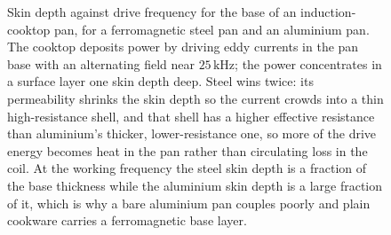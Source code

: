 \begin{figure}[htbp]
\centering
{}
\caption[Skin depth against frequency for an induction-cooktop pan]{Skin
depth against drive frequency for the base of an induction-cooktop pan, for
a ferromagnetic steel pan and an aluminium pan. The cooktop deposits power
by driving eddy currents in the pan base with an alternating field near
$25\,\si{\kilo\hertz}$; the power concentrates in a surface layer one skin
depth deep. Steel wins twice: its permeability shrinks the skin depth so
the current crowds into a thin high-resistance shell, and that shell has a
higher effective resistance than aluminium's thicker, lower-resistance one,
so more of the drive energy becomes heat in the pan rather than
circulating loss in the coil. At the working frequency the steel skin depth
is a fraction of the base thickness while the aluminium skin depth is a
large fraction of it, which is why a bare aluminium pan couples poorly and
plain cookware carries a ferromagnetic base layer.}
\label{fig:vol04ch08:induction-cooktop}
\end{figure}
